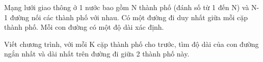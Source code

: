 Mạng lưới giao thông ở 1 nước bao gồm N thành phố (đánh số từ 1 đến N) và N-1 đường nối các thành phố với nhau. Có một đường đi duy nhất giữa mỗi cặp thành phố. Mỗi con đường có một độ dài xác định.  

   Viết chương trình, với mỗi K cặp thành phố cho trước, tìm độ dài của con đường ngắn nhất và dài nhất trên đường đi giữa 2 thành phố này.